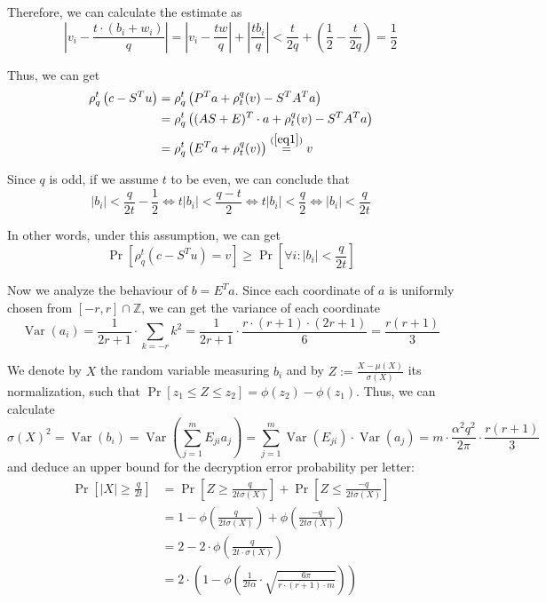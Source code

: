 Therefore, we can calculate the estimate as
\begin{equation}
    \left|v_{i}-\frac{t \cdot\left(b_{i}+w_{i}\right)}{q}\right|=\left|v_{i}-\frac{t w}{q}\right|+\left|\frac{t b_{i}}{q}\right|<\frac{t}{2 q}+\left(\frac{1}{2}-\frac{t}{2 q}\right)=\frac{1}{2}\label{eq1}
\end{equation}

Thus, we can get 
\begin{align*}
    \rho_{q}^{t}\left(c-S^{T} u\right)&=\rho_{q}^{t}\left(P^{T} a+\rho_{t}^{q}(v)-S^{T} A^{T} a\right)\\
    &=\rho_{q}^{t}\left((A S+E)^{T} \cdot a+\rho_{t}^{q}(v)-S^{T} A^{T} a\right)\\
    &=\rho_{q}^{t}\left(E^{T} a+\rho_{t}^{q}(v)\right) \stackrel{(\ref{eq1})}{=} v
\end{align*}

Since $q$ is odd, if we assume $t$ to be even, we can conclude that
$$\left|b_{i}\right|<\frac{q}{2 t}-\frac{1}{2} \Leftrightarrow t\left|b_{i}\right|<\frac{q-t}{2} \Leftrightarrow t\left|b_{i}\right|<\frac{q}{2} \Leftrightarrow\left|b_{i}\right|<\frac{q}{2 t}$$

In other words, under this assumption, we can get
\begin{equation}
    \operatorname{Pr}\left[\rho_{q}^{t}\left(c-S^{T} u\right)=v\right] \geq \operatorname{Pr}\left[\forall i :\left|b_{i}\right|<\frac{q}{2 t}\right]\label{eq2}
\end{equation}

Now we analyze the behaviour of $b=E^{T} a$. Since each coordinate of $a$ is uniformly chosen from $[-r, r] \cap \mathbb{Z}$, we can get the variance of each coordinate
$$\operatorname{Var}\left(a_{i}\right)=\frac{1}{2 r+1} \cdot \sum_{k=-r} k^{2}=\frac{1}{2 r+1} \cdot \frac{r \cdot(r+1) \cdot(2 r+1)}{6}=\frac{r(r+1)}{3}$$

We denote by $X$ the random variable measuring $b_{i}$ and by $Z :=\frac{X-\mu(X)}{\sigma(X)}$ its normalization, such that $\operatorname{Pr}\left[z_{1} \leq Z \leq z_{2}\right]=\phi\left(z_{2}\right)-\phi\left(z_{1}\right) .$ Thus, we can calculate
    $$\sigma(X)^{2}=\operatorname{Var}\left(b_{i}\right)=\operatorname{Var}\left(\sum_{j=1}^{m} E_{j i} a_{j}\right)=\sum_{j=1}^{m} \operatorname{Var}\left(E_{j i}\right) \cdot \operatorname{Var}\left(a_{j}\right)=m \cdot \frac{\alpha^{2} q^{2}}{2 \pi} \cdot \frac{r(r+1)}{3}$$
and deduce an upper bound for the decryption error probability per letter:
\begin{align*}
    \operatorname{Pr}\left[|X| \geq \frac{q}{2 t}\right]&=\operatorname{Pr}\left[Z \geq \frac{q}{2 t \sigma(X)}\right]+\operatorname{Pr}\left[Z \leq \frac{-q}{2 t \sigma(X)}\right]\\
    &=1-\phi\left(\frac{q}{2 t \sigma(X)}\right)+\phi\left(\frac{-q}{2 t \sigma(X)}\right)\\
    &=2-2 \cdot \phi\left(\frac{q}{2 t \cdot \sigma(X)}\right)\\
    &=2 \cdot\left(1-\phi\left(\frac{1}{2 t \alpha} \cdot \sqrt{\frac{6 \pi}{r \cdot(r+1) \cdot m}}\right)\right)
\end{align*}


